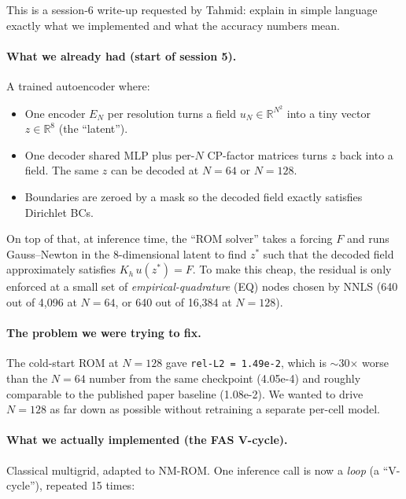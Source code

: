 This is a session-6 write-up requested by Tahmid: explain in simple
language exactly what we implemented and what the accuracy numbers mean.

\paragraph{What we already had (start of session 5).}
A trained autoencoder where:
\begin{itemize}
  \item One encoder $E_{N}$ per resolution turns a field $u_{N} \in \mathbb{R}^{N^2}$
        into a tiny vector $z \in \mathbb{R}^8$ (the ``latent'').
  \item One decoder shared MLP plus per-$N$ CP-factor matrices turns $z$
        back into a field. The same $z$ can be decoded at $N=64$ or $N=128$.
  \item Boundaries are zeroed by a mask so the decoded field exactly
        satisfies Dirichlet BCs.
\end{itemize}
On top of that, at inference time, the ``ROM solver'' takes a forcing $F$
and runs Gauss--Newton in the 8-dimensional latent to find $z^\ast$ such
that the decoded field approximately satisfies $K_h\,u(z^\ast) = F$. To
make this cheap, the residual is only enforced at a small set of
\emph{empirical-quadrature} (EQ) nodes chosen by NNLS (640 out of 4{,}096
at $N=64$, or 640 out of 16{,}384 at $N=128$).

\paragraph{The problem we were trying to fix.}
The cold-start ROM at $N=128$ gave \texttt{rel-L2 = 1.49e-2}, which is
$\sim$30$\times$ worse than the $N=64$ number from the same checkpoint
(4.05e-4) and roughly comparable to the published paper baseline
(1.08e-2). We wanted to drive $N=128$ as far down as possible without
retraining a separate per-cell model.

\paragraph{What we actually implemented (the FAS V-cycle).}
Classical multigrid, adapted to NM-ROM. One inference call is now a
\emph{loop} (a ``V-cycle''), repeated 15 times:

